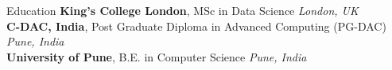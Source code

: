 \documentclass{resume} %
\begin{document}

\begin{rSection}{Education}
{\bf King's College London}, MSc in Data Science \hfill {\em London, UK}\\
{\bf C-DAC, India}, Post Graduate Diploma in Advanced Computing (PG-DAC) \hfill {\em Pune, India}\\
{\bf University of Pune}, B.E. in Computer Science \hfill {\em Pune, India}
\end{rSection}

\end{document}
